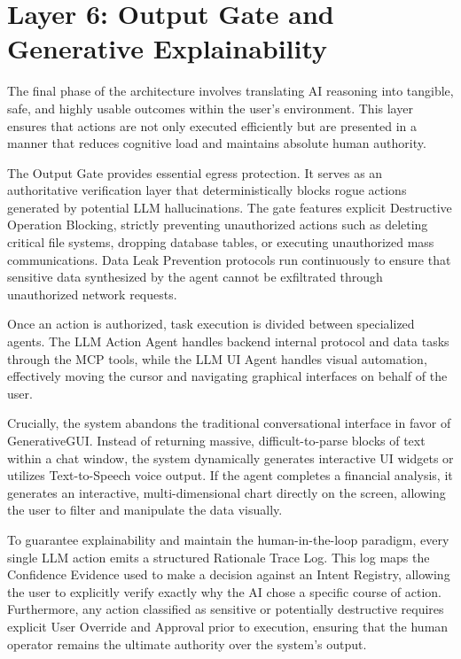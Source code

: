 \documentclass[12pt, a4paper]{report}
\begin{document}
\section{Layer 6: Output Gate and Generative Explainability}
The final phase of the architecture involves translating AI reasoning into tangible, safe, and highly usable outcomes within the user's environment.\cite{hojo2025} This layer ensures that actions are not only executed efficiently but are presented in a manner that reduces cognitive load and maintains absolute human authority.

The Output Gate provides essential egress protection. It serves as an authoritative verification layer that deterministically blocks rogue actions generated by potential LLM hallucinations.\cite{hojo2025} The gate features explicit Destructive Operation Blocking, strictly preventing unauthorized actions such as deleting critical file systems, dropping database tables, or executing unauthorized mass communications.\cite{hojo2025} Data Leak Prevention protocols run continuously to ensure that sensitive data synthesized by the agent cannot be exfiltrated through unauthorized network requests.

Once an action is authorized, task execution is divided between specialized agents. The LLM Action Agent handles backend internal protocol and data tasks through the MCP tools, while the LLM UI Agent handles visual automation, effectively moving the cursor and navigating graphical interfaces on behalf of the user.\cite{hojo2025}

Crucially, the system abandons the traditional conversational interface in favor of GenerativeGUI.\cite{hojo2025} Instead of returning massive, difficult-to-parse blocks of text within a chat window, the system dynamically generates interactive UI widgets or utilizes Text-to-Speech voice output.\cite{hojo2025} If the agent completes a financial analysis, it generates an interactive, multi-dimensional chart directly on the screen, allowing the user to filter and manipulate the data visually.\cite{arxiv2508}

To guarantee explainability and maintain the human-in-the-loop paradigm, every single LLM action emits a structured Rationale Trace Log.\cite{hojo2025} This log maps the Confidence Evidence used to make a decision against an Intent Registry, allowing the user to explicitly verify exactly why the AI chose a specific course of action.\cite{hojo2025} Furthermore, any action classified as sensitive or potentially destructive requires explicit User Override and Approval prior to execution, ensuring that the human operator remains the ultimate authority over the system's output.\cite{hojo2025}
\end{document}
